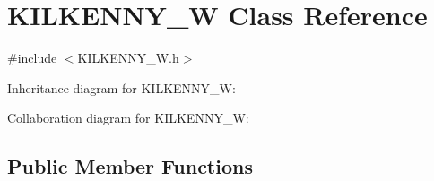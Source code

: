 \hypertarget{class_k_i_l_k_e_n_n_y___w}{}\section{K\+I\+L\+K\+E\+N\+N\+Y\+\_\+W Class Reference}
\label{class_k_i_l_k_e_n_n_y___w}


{\ttfamily \#include $<$K\+I\+L\+K\+E\+N\+N\+Y\+\_\+\+W.\+h$>$}



Inheritance diagram for K\+I\+L\+K\+E\+N\+N\+Y\+\_\+W\+:


Collaboration diagram for K\+I\+L\+K\+E\+N\+N\+Y\+\_\+W\+:
\subsection*{Public Member Functions}
